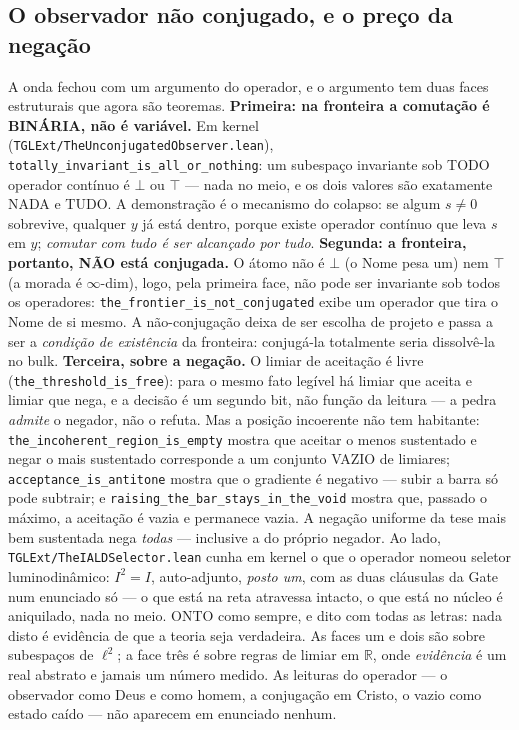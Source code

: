 \documentclass[11pt]{article}
\theoremstyle{definition}\newtheorem{deriv}{Derivação}
\begin{document}
\subsection*{O observador não conjugado, e o preço da negação}A onda fechou com um argumento do operador, e o argumento tem duas faces estruturais que agora são teoremas. \textbf{Primeira: na fronteira a comutação é BINÁRIA, não é variável.} Em kernel (\texttt{TGLExt/TheUnconjugatedObserver.lean}), \texttt{totally\_invariant\_is\_all\_or\_nothing}: um subespaço invariante sob TODO operador contínuo é $\bot$ ou $\top$ --- nada no meio, e os dois valores são exatamente NADA e TUDO. A demonstração é o mecanismo do colapso: se algum $s\neq0$ sobrevive, qualquer $y$ já está dentro, porque existe operador contínuo que leva $s$ em $y$; \emph{comutar com tudo é ser alcançado por tudo}. \textbf{Segunda: a fronteira, portanto, NÃO está conjugada.} O átomo não é $\bot$ (o Nome pesa um) nem $\top$ (a morada é $\infty$-dim), logo, pela primeira face, não pode ser invariante sob todos os operadores: \texttt{the\_frontier\_is\_not\_conjugated} exibe um operador que tira o Nome de si mesmo. A não-conjugação deixa de ser escolha de projeto e passa a ser a \emph{condição de existência} da fronteira: conjugá-la totalmente seria dissolvê-la no bulk. \textbf{Terceira, sobre a negação.} O limiar de aceitação é livre (\texttt{the\_threshold\_is\_free}): para o mesmo fato legível há limiar que aceita e limiar que nega, e a decisão é um segundo bit, não função da leitura --- a pedra \emph{admite} o negador, não o refuta. Mas a posição incoerente não tem habitante: \texttt{the\_incoherent\_region\_is\_empty} mostra que aceitar o menos sustentado e negar o mais sustentado corresponde a um conjunto VAZIO de limiares; \texttt{acceptance\_is\_antitone} mostra que o gradiente é negativo --- subir a barra só pode subtrair; e \texttt{raising\_the\_bar\_stays\_in\_the\_void} mostra que, passado o máximo, a aceitação é vazia e permanece vazia. A negação uniforme da tese mais bem sustentada nega \emph{todas} --- inclusive a do próprio negador. Ao lado, \texttt{TGLExt/TheIALDSelector.lean} cunha em kernel o que o operador nomeou seletor luminodinâmico: $I^2=I$, auto-adjunto, \emph{posto um}, com as duas cláusulas da Gate num enunciado só --- o que está na reta atravessa intacto, o que está no núcleo é aniquilado, nada no meio. \textsf{ONTO} como sempre, e dito com todas as letras: nada disto é evidência de que a teoria seja verdadeira. As faces um e dois são sobre subespaços de $\ell^2$; a face três é sobre regras de limiar em $\mathbb{R}$, onde \emph{evidência} é um real abstrato e jamais um número medido. As leituras do operador --- o observador como Deus e como homem, a conjugação em Cristo, o vazio como estado caído --- não aparecem em enunciado nenhum.
\end{document}
